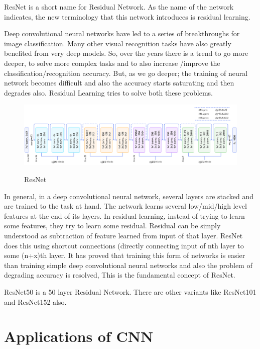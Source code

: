 \documentclass[12pt]{article}
\begin{document}
ResNet is a short name for Residual Network. As the name of the network indicates, the new terminology that this network introduces is residual learning.


Deep convolutional neural networks have led to a series of breakthroughs for image classification. Many other visual recognition tasks have also greatly benefited from very deep models. So, over the years there is a trend to go more deeper, to solve more complex tasks and to also increase /improve the classification/recognition accuracy. But, as we go deeper; the training of neural network becomes difficult and also the accuracy starts saturating and then degrades also. Residual Learning tries to solve both these problems.

\begin{figure}[h]
    	\centering
    	\includegraphics[width=1\textwidth]{resnet.png}
       	\label{fig:mesh19}
	 	 \caption{ResNet}
	\end{figure} 

In general, in a deep convolutional neural network, several layers are stacked and are trained to the task at hand. The network learns several low/mid/high level features at the end of its layers. In residual learning, instead of trying to learn some features, they try to learn some residual. Residual can be simply understood as subtraction of feature learned from input of that layer. ResNet does this using shortcut connections (directly connecting input of nth layer to some (n+x)th layer. It has proved that training this form of networks is easier than training simple deep convolutional neural networks and also the problem of degrading accuracy is resolved, This is the fundamental concept of ResNet.

ResNet50 is a 50 layer Residual Network. There are other variants like ResNet101 and ResNet152 also.        
        
\section{\fontsize{14}{14}\selectfont Applications of CNN}
\end{document}
